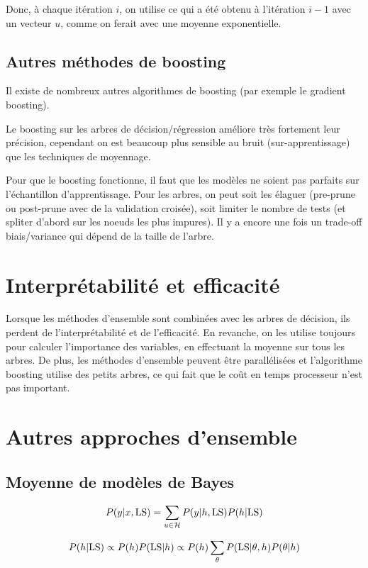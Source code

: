 	Donc, à chaque itération $i$, on utilise ce qui a été obtenu à l'itération $i - 1$ avec un vecteur $u$, comme on ferait avec une moyenne exponentielle.
	
	\subsection{Autres méthodes de boosting}
	
	Il existe de nombreux autres algorithmes de boosting (par exemple le gradient boosting).
	
	Le boosting sur les arbres de décision/régression améliore très fortement leur précision, cependant on est beaucoup plus sensible au bruit (sur-apprentissage) que les techniques de moyennage.
	
	Pour que le boosting fonctionne, il faut que les modèles ne soient pas parfaits sur l'échantillon d'apprentissage. Pour les arbres, on peut soit les élaguer (pre-prune ou post-prune avec de la validation croisée), soit limiter le nombre de tests (et spliter d'abord sur les noeuds les plus impures). Il y a encore une fois un trade-off biais/variance qui dépend de la taille de l'arbre.
	
\section{Interprétabilité et efficacité}
	
Lorsque les méthodes d'ensemble sont combinées avec les arbres de décision, ils perdent de l'interprétabilité et de l'efficacité. En revanche, on les utilise toujours pour calculer l'importance des variables, en effectuant la moyenne sur tous les arbres. De plus, les méthodes d'ensemble peuvent être parallélisées et l'algorithme boosting utilise des petits arbres, ce qui fait que le coût en temps processeur n'est pas important.
		
	
\section{Autres approches d'ensemble}

	\subsection{Moyenne de modèles de Bayes}
	$$P(y \vert x, \text{LS}) = \sum_{u \in \mathcal{H}} P(y \vert h, \text{LS}) P(h \vert \text{LS})$$
	
	$$P(h \vert \text{LS}) \propto P(h) P(\text{LS} \vert h) \propto P(h) \sum_\theta P(\text{LS} \vert \theta, h) P(\theta \vert h)$$
	
